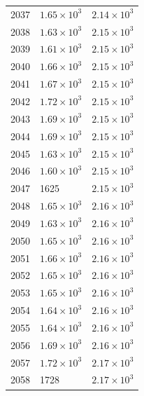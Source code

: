 \begin{table}[H]
\begin{tabular}{lll}
2037 & $\displaystyle 1.65 \times 10^{3}$ & $\displaystyle 2.14 \times 10^{3}$ \\
2038 & $\displaystyle 1.63 \times 10^{3}$ & $\displaystyle 2.15 \times 10^{3}$ \\
2039 & $\displaystyle 1.61 \times 10^{3}$ & $\displaystyle 2.15 \times 10^{3}$ \\
2040 & $\displaystyle 1.66 \times 10^{3}$ & $\displaystyle 2.15 \times 10^{3}$ \\
2041 & $\displaystyle 1.67 \times 10^{3}$ & $\displaystyle 2.15 \times 10^{3}$ \\
2042 & $\displaystyle 1.72 \times 10^{3}$ & $\displaystyle 2.15 \times 10^{3}$ \\
2043 & $\displaystyle 1.69 \times 10^{3}$ & $\displaystyle 2.15 \times 10^{3}$ \\
2044 & $\displaystyle 1.69 \times 10^{3}$ & $\displaystyle 2.15 \times 10^{3}$ \\
2045 & $\displaystyle 1.63 \times 10^{3}$ & $\displaystyle 2.15 \times 10^{3}$ \\
2046 & $\displaystyle 1.60 \times 10^{3}$ & $\displaystyle 2.15 \times 10^{3}$ \\
2047 & 1625 & $\displaystyle 2.15 \times 10^{3}$ \\
2048 & $\displaystyle 1.65 \times 10^{3}$ & $\displaystyle 2.16 \times 10^{3}$ \\
2049 & $\displaystyle 1.63 \times 10^{3}$ & $\displaystyle 2.16 \times 10^{3}$ \\
2050 & $\displaystyle 1.65 \times 10^{3}$ & $\displaystyle 2.16 \times 10^{3}$ \\
2051 & $\displaystyle 1.66 \times 10^{3}$ & $\displaystyle 2.16 \times 10^{3}$ \\
2052 & $\displaystyle 1.65 \times 10^{3}$ & $\displaystyle 2.16 \times 10^{3}$ \\
2053 & $\displaystyle 1.65 \times 10^{3}$ & $\displaystyle 2.16 \times 10^{3}$ \\
2054 & $\displaystyle 1.64 \times 10^{3}$ & $\displaystyle 2.16 \times 10^{3}$ \\
2055 & $\displaystyle 1.64 \times 10^{3}$ & $\displaystyle 2.16 \times 10^{3}$ \\
2056 & $\displaystyle 1.69 \times 10^{3}$ & $\displaystyle 2.16 \times 10^{3}$ \\
2057 & $\displaystyle 1.72 \times 10^{3}$ & $\displaystyle 2.17 \times 10^{3}$ \\
2058 & 1728 & $\displaystyle 2.17 \times 10^{3}$ \\

\end{tabular}
\end{table}
